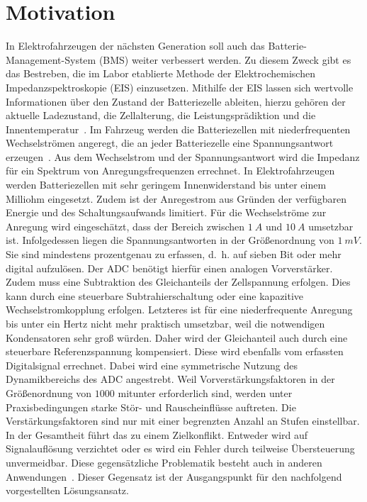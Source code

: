 \section{Motivation}	

In Elektrofahrzeugen der nächsten Generation soll auch das Batterie-Management-System (BMS) weiter verbessert werden. Zu diesem Zweck gibt es das Bestreben, die im Labor etablierte Methode der Elektrochemischen Impedanzspektroskopie (EIS) einzusetzen. Mithilfe der EIS lassen sich wertvolle Informationen über den Zustand der Batteriezelle ableiten, hierzu gehören der aktuelle Ladezustand, die Zellalterung, die Leistungsprädiktion und die Innentemperatur~\cite{Schmidt-2013, Kohs-2022}. Im Fahrzeug werden die Batteriezellen mit niederfrequenten Wechselströmen angeregt, die an jeder Batteriezelle eine Spannungsantwort erzeugen~\cite{KeilJossen-2012, Roscher-2016, Hammerschmidt-2016}. Aus dem Wechselstrom und der Spannungsantwort wird die Impedanz für ein Spektrum von Anregungsfrequenzen errechnet. In Elektrofahrzeugen werden Batteriezellen mit sehr geringem Innenwiderstand bis unter einem Milliohm eingesetzt. Zudem ist der Anregestrom aus Gründen der verfügbaren Energie und des Schaltungsaufwands limitiert. Für die Wechselströme zur Anregung wird eingeschätzt, dass der Bereich zwischen $\SI{1}{A}$ und $\SI{10}{A}$ umsetzbar ist. Infolgedessen liegen die Spannungsantworten in der Größenordnung von $\SI{1}{mV}$. Sie sind mindestens prozentgenau zu erfassen, d.~h. auf sieben Bit oder mehr digital aufzulösen. Der ADC benötigt hierfür einen analogen Vorverstärker. Zudem muss eine Subtraktion des Gleichanteils der Zellspannung erfolgen. Dies kann durch eine steuerbare Subtrahierschaltung oder eine kapazitive Wechselstromkopplung erfolgen. Letzteres ist für eine niederfrequente Anregung bis unter ein Hertz nicht mehr praktisch umsetzbar, weil die notwendigen Kondensatoren sehr groß würden. Daher wird der Gleichanteil auch durch eine steuerbare Referenzspannung kompensiert. Diese wird ebenfalls vom erfassten Digitalsignal errechnet. Dabei wird eine symmetrische Nutzung des Dynamikbereichs des ADC angestrebt. Weil Vorverstärkungsfaktoren in der Größenordnung von $1000$ mitunter erforderlich sind, werden unter Praxisbedingungen starke Stör- und Rauscheinflüsse auftreten. Die Verstärkungsfaktoren sind nur mit einer begrenzten Anzahl an Stufen einstellbar. In der Gesamtheit führt das zu einem Zielkonflikt. Entweder wird auf Signalauflösung verzichtet oder es wird ein Fehler durch teilweise Übersteuerung unvermeidbar. Diese gegensätzliche Problematik besteht auch in anderen Anwendungen~\cite{Abel-1991,Ting-2013, Zhou-2019, Chan-2012}.
Dieser Gegensatz ist der Ausgangspunkt für den nachfolgend vorgestellten Lösungsansatz.


